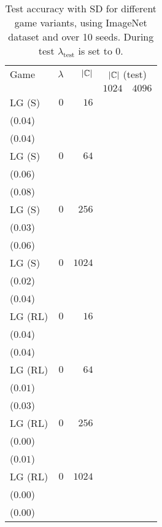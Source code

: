 \begin{table*}[t]
\linespread{0.6}\selectfont\centering
\centering
\caption{Test accuracy with SD for different game variants, using ImageNet dataset and over 10 seeds. During test \(\lambda_{\text{test}}\) is set to \(0\).}
\label{table:lg_imagenet_0_test_reward}
\begin{tabular}{lrrrr}
\toprule
Game & \(\lambda\) & \(|{\mathbb{C}}|\) & \multicolumn{2}{c}{\(|{\mathbb{C}}|\) (test)} \\[1ex]
 &  &  & \multicolumn{1}{c}{\(1024\)} & \multicolumn{1}{c}{\(4096\)} \\
\midrule
LG {\scriptsize(S)} & \(0\) & \(16\) & \longcell{\(0.61\)\\{\tiny(\(0.04\))}} & \longcell{\(0.35\)\\{\tiny(\(0.04\))}} \\[2.2ex]
LG {\scriptsize(S)} & \(0\) & \(64\) & \longcell{\(0.76\)\\{\tiny(\(0.06\))}} & \longcell{\(0.52\)\\{\tiny(\(0.08\))}} \\[2.2ex]
LG {\scriptsize(S)} & \(0\) & \(256\) & \longcell{\(0.88\)\\{\tiny(\(0.03\))}} & \longcell{\(0.71\)\\{\tiny(\(0.06\))}} \\[2.2ex]
LG {\scriptsize(S)} & \(0\) & \(1024\) & \longcell{\(0.96\)\\{\tiny(\(0.02\))}} & \longcell{\(0.88\)\\{\tiny(\(0.04\))}} \\[2.2ex]
LG {\scriptsize(RL)} & \(0\) & \(16\) & \longcell{\(0.67\)\\{\tiny(\(0.04\))}} & \longcell{\(0.39\)\\{\tiny(\(0.04\))}} \\[2.2ex]
LG {\scriptsize(RL)} & \(0\) & \(64\) & \longcell{\(0.93\)\\{\tiny(\(0.01\))}} & \longcell{\(0.79\)\\{\tiny(\(0.03\))}} \\[2.2ex]
LG {\scriptsize(RL)} & \(0\) & \(256\) & \longcell{\(0.98\)\\{\tiny(\(0.00\))}} & \longcell{\(0.94\)\\{\tiny(\(0.01\))}} \\[2.2ex]
LG {\scriptsize(RL)} & \(0\) & \(1024\) & \longcell{\(0.99\)\\{\tiny(\(0.00\))}} & \longcell{\(0.97\)\\{\tiny(\(0.00\))}} \\[2.2ex]

\end{tabular}
\end{table*}
